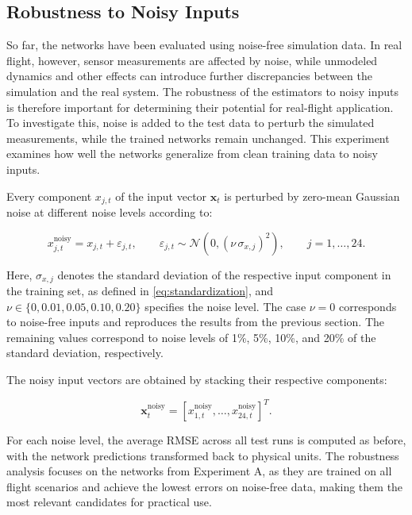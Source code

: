 \subsection{Robustness to Noisy Inputs}
\label{sec:5.4Robustness}

So far, the networks have been evaluated using noise-free simulation data. In real flight, however, sensor measurements are affected by noise, while unmodeled dynamics and other effects can introduce further discrepancies between the simulation and the real system. The robustness of the estimators to noisy inputs is therefore important for determining their potential for real-flight application. To investigate this, noise is added to the test data to perturb the simulated measurements, while the trained networks remain unchanged. This experiment examines how well the networks generalize from clean training data to noisy inputs.

Every component $x_{j,t}$ of the input vector $\bm{x}_t$ is perturbed by zero-mean Gaussian noise at different noise levels according to:

\begin{equation}
	x^{\mathrm{noisy}}_{j,t} = x_{j,t} + \varepsilon_{j,t}, \qquad \varepsilon_{j,t} \sim \mathcal{N}\!\left(0, (\nu \, \sigma_{x,j})^2\right), \qquad j = 1, \dots, 24.
	\label{eq:noise_model}
\end{equation}

Here, $\sigma_{x,j}$ denotes the standard deviation of the respective input component in the training set, as defined in \eqref{eq:standardization}, and $\nu \in \{0, 0.01, 0.05, 0.10, 0.20\}$ specifies the noise level. The case $\nu = 0$ corresponds to noise-free inputs and reproduces the results from the previous section. The remaining values correspond to noise levels of 1\%, 5\%, 10\%, and 20\% of the standard deviation, respectively.

The noisy input vectors are obtained by stacking their respective components:

\begin{equation}
	\bm{x}_t^\mathrm{noisy} = [x_{1,t}^\mathrm{noisy}, \dots, x_{24,t}^\mathrm{noisy}]^T .
\end{equation}

For each noise level, the average RMSE across all test runs is computed as before, with the network predictions transformed back to physical units. The robustness analysis focuses on the networks from Experiment A, as they are trained on all flight scenarios and achieve the lowest errors on noise-free data, making them the most relevant candidates for practical use.


